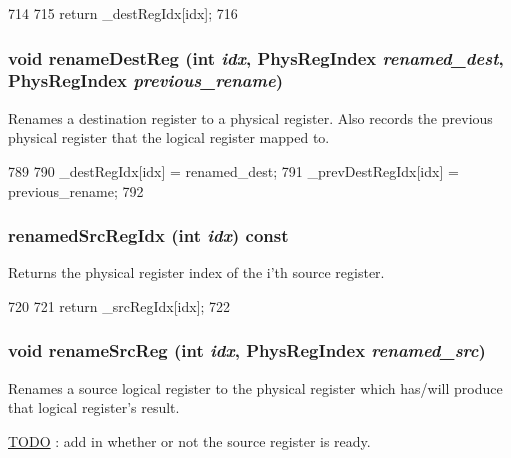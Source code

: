\begin{DoxyCode}
714     {
715         return _destRegIdx[idx];
716     }
\end{DoxyCode}
\hypertarget{classInOrderDynInst_a9ae02d3c598d15a5c835ab7d4e647ce1}{
\subsubsection[{renameDestReg}]{\setlength{\rightskip}{0pt plus 5cm}void renameDestReg (int {\em idx}, \/  {\bf PhysRegIndex} {\em renamed\_\-dest}, \/  {\bf PhysRegIndex} {\em previous\_\-rename})}}
\label{classInOrderDynInst_a9ae02d3c598d15a5c835ab7d4e647ce1}
Renames a destination register to a physical register. Also records the previous physical register that the logical register mapped to. 


\begin{DoxyCode}
789     {
790         _destRegIdx[idx] = renamed_dest;
791         _prevDestRegIdx[idx] = previous_rename;
792     }
\end{DoxyCode}
\hypertarget{classInOrderDynInst_a77110024c396fae8eb7cc90446c05100}{
\subsubsection[{renamedSrcRegIdx}]{ renamedSrcRegIdx (int {\em idx}) const}}
\label{classInOrderDynInst_a77110024c396fae8eb7cc90446c05100}
Returns the physical register index of the i'th source register. 


\begin{DoxyCode}
720     {
721         return _srcRegIdx[idx];
722     }
\end{DoxyCode}
\hypertarget{classInOrderDynInst_af3d4e52aa8ea0b526cd9f78f67127f36}{
\subsubsection[{renameSrcReg}]{\setlength{\rightskip}{0pt plus 5cm}void renameSrcReg (int {\em idx}, \/  {\bf PhysRegIndex} {\em renamed\_\-src})}}
\label{classInOrderDynInst_af3d4e52aa8ea0b526cd9f78f67127f36}
Renames a source logical register to the physical register which has/will produce that logical register's result. \begin{Desc}
\item[\hyperlink{todo__todo000019}{TODO}]: add in whether or not the source register is ready. \end{Desc}



